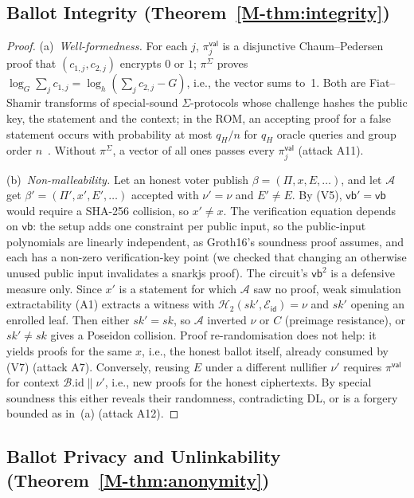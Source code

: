 \documentclass[10pt,letterpaper,journal]{IEEEtran}
\begin{document}
\subsection{Ballot Integrity (Theorem~\ref{M-thm:integrity})}
\label{sec:supp-proof-integrity}

\begin{proof}
(a)~\emph{Well-formedness.} For each $j$, $\pi^{\mathsf{val}}_j$ is a disjunctive Chaum--Pedersen proof that $(c_{1,j}, c_{2,j})$ encrypts $0$ or $1$; $\pi^{\Sigma}$ proves $\log_G \sum_j c_{1,j} = \log_h (\sum_j c_{2,j} - G)$, i.e., the vector sums to~1. Both are Fiat--Shamir transforms of special-sound $\Sigma$-protocols whose challenge hashes the public key, the statement and the context; in the ROM, an accepting proof for a false statement occurs with probability at most $q_H/n$ for $q_H$ oracle queries and group order $n$~\cite{Bernhard2012}. Without $\pi^{\Sigma}$, a vector of all ones passes every $\pi^{\mathsf{val}}_j$ (attack A11).

(b)~\emph{Non-malleability.} Let an honest voter publish $\beta = (\Pi, x, E, \ldots)$, and let $\mathcal{A}$ get $\beta' = (\Pi', x', E', \ldots)$ accepted with $\nu' = \nu$ and $E' \neq E$. By (V5), $\mathsf{vb}' = \mathsf{vb}$ would require a SHA-256 collision, so $x' \neq x$. The verification equation depends on $\mathsf{vb}$: the setup adds one constraint per public input, so the public-input polynomials are linearly independent, as Groth16's soundness proof assumes, and each has a non-zero verification-key point (we checked that changing an otherwise unused public input invalidates a snarkjs proof). The circuit's $\mathsf{vb}^2$ is a defensive measure only. Since $x'$ is a statement for which $\mathcal{A}$ saw no proof, weak simulation extractability (A1) extracts a witness with $\mathcal{H}_2(sk', \mathcal{E}_{\mathsf{id}}) = \nu$ and $sk'$ opening an enrolled leaf. Then either $sk' = sk$, so $\mathcal{A}$ inverted $\nu$ or $C$ (preimage resistance), or $sk' \neq sk$ gives a Poseidon collision. Proof re-randomisation does not help: it yields proofs for the same $x$, i.e., the honest ballot itself, already consumed by (V7) (attack A7). Conversely, reusing $E$ under a different nullifier $\nu'$ requires $\pi^{\mathsf{val}}$ for context $\mathcal{B}.\mathrm{id}\|\nu'$, i.e., new proofs for the honest ciphertexts. By special soundness this either reveals their randomness, contradicting DL, or is a forgery bounded as in~(a) (attack A12).
\end{proof}

\subsection{Ballot Privacy and Unlinkability (Theorem~\ref{M-thm:anonymity})}
\label{sec:supp-proof-anonymity}
\end{document}
